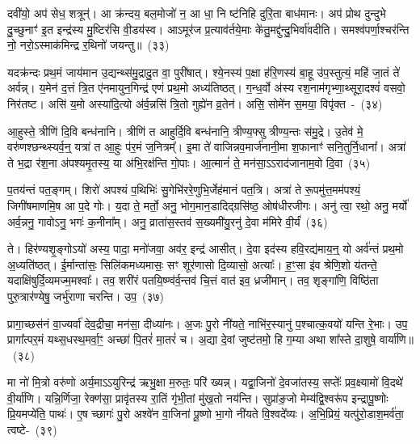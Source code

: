दवी॑यो॒ अप॑ सेध॒ शत्रून्॑। आ क्र॑न्दय॒ बल॒मोजो॑ न॒ आ धा॒ नि ष्ट॑निहि दुरि॒ता बाध॑मानः। अप॑ प्रोथ दुन्दुभे दु॒च्छुनाꣳ॑ इ॒त इन्द्र॑स्य मु॒ष्टिर॑सि वी॒डय॑स्व। आऽमूर॑ज प्र॒त्याव॑र्तये॒माः के॑तु॒मद्दु॑न्दु॒भिर्वा॑वदीति। समश्व॑पर्णा॒श्चर॑न्ति नो॒ नरो॒\-ऽस्माक॑मिन्द्र र॒थिनो॑ जयन्तु॥~(३३)\ip

{\anuvakamend[{धन्व॑न्महि॒मानं॒ ब्राह्म॑णा॒सो\-ऽदि॑तिः पृथि॒व्याः परि॑ दू॒रादेक॑चत्वारिꣳशच्च}]}

यदक्र॑न्दः प्रथ॒मं जाय॑मान उ॒द्यन्थ्स॑मु॒द्रादु॒त वा॒ पुरी॑षात्। श्ये॒नस्य॑ प॒क्षा ह॑रि॒णस्य॑ बा॒हू उ॑प॒स्तुत्यं॒ महि॑ जा॒तं ते॑ अर्वन्न्। य॒मेन॑ द॒त्तं त्रि॒त ए॑नमायुन॒गिन्द्र॑ एणं प्रथ॒मो अध्य॑तिष्ठत्। ग॒न्ध॒र्वो अ॑स्य रश॒नाम॑गृभ्णा॒थ्सूरा॒दश्वं॑ वसवो॒ निर॑तष्ट। असि॑ य॒मो अस्या॑दि॒त्यो अ॑र्व॒न्नसि॑ त्रि॒तो गुह्ये॑न व्र॒तेन॑। असि॒ सोमे॑न स॒मया॒ विपृ॑क्त~-~(३४)\ip

आ॒हुस्ते॒ त्रीणि॑ दि॒वि बन्ध॑नानि। त्रीणि॑ त आहुर्दि॒वि बन्ध॑नानि॒ त्रीण्य॒फ्सु त्रीण्य॒न्तः स॑मु॒द्रे। उ॒तेव॑ मे॒ वरु॑णश्छन्थ्स्यर्व॒न्॒ यत्रा॑ त आ॒हुः प॑र॒मं ज॒नित्रम्᳚। इ॒मा ते॑ वाजिन्नव॒मार्ज॑नानी॒मा श॒फानाꣳ॑ सनि॒तुर्नि॒धाना᳚। अत्रा॑ ते भ॒द्रा र॑श॒ना अ॑पश्यमृ॒तस्य॒ या अ॑भि॒रक्ष॑न्ति गो॒पाः। आ॒त्मानं॑ ते॒ मन॑सा॒\-ऽऽ\-राद॑जानाम॒वो दि॒वा~(३५)\ip

प॒तय॑न्तं पत॒ङ्गम्। शिरो॑ अपश्यं प॒थिभिः॑ सु॒गेभि॑ररे॒णुभि॒र्जेह॑मानं पत॒त्रि। अत्रा॑ ते रू॒पमु॑त्त॒मम॑पश्यं॒ जिगी॑षमाणमि॒ष आ प॒दे गोः। य॒दा ते॒ मर्तो॒ अनु॒ भोग॒मान॒डादिद्ग्रसि॑ष्ठ॒ ओष॑धीरजीगः। अनु॑ त्वा॒ रथो॒ अनु॒ मर्यो॑ अर्व॒न्ननु॒ गावो\-ऽनु॒ भगः॑ क॒नीना᳚म्। अनु॒ व्राता॑स॒स्तव॑ स॒ख्यमी॑यु॒रनु॑ दे॒वा म॑मिरे वी॒र्यं॑~(३६)\ip

ते। हिर॑ण्यशृ॒ङ्गो\-ऽयो॑ अस्य॒ पादा॒ मनो॑जवा॒ अव॑र॒ इन्द्र॑ आसीत्। दे॒वा इद॑स्य हवि॒रद्य॑माय॒न्॒ यो अर्व॑न्तं प्रथ॒मो अ॒ध्यति॑ष्ठत्। ई॒र्मान्ता॑सः॒ सिलि॑कमध्यमासः॒ सꣳ शूर॑णासो दि॒व्यासो॒ अत्याः᳚। ह॒ꣳ॒सा इ॑व श्रेणि॒शो य॑तन्ते॒ यदाक्षि॑षुर्दि॒व्यमज्म॒मश्वाः᳚। तव॒ शरी॑रं पतयि॒ष्ण्व॑र्व॒न्तव॑ चि॒त्तं वात॑ इव॒ ध्रजी॑मान्। तव॒ शृङ्गा॑णि॒ विष्ठि॑ता पुरु॒त्रार॑ण्येषु॒ जर्भु॑राणा चरन्ति। उप॒~(३७)\ip

प्रागा॒च्छस॑नं वा॒ज्यर्वा॑ देव॒द्रीचा॒ मन॑सा॒ दीध्या॑नः। अ॒जः पु॒रो नी॑यते॒ नाभि॑र॒स्यानु॑ प॒श्चात्क॒वयो॑ यन्ति रे॒भाः। उप॒ प्रागा᳚त्पर॒मं यथ्स॒धस्थ॒मर्वा॒ꣳ॒ अच्छा॑ पि॒तरं॑ मा॒तरं॑ च। अ॒द्या दे॒वां जुष्ट॑तमो॒ हि ग॒म्या अथा शा᳚स्ते दा॒शुषे॒ वार्या॑णि॥~(३८)\ip

{\anuvakamend[{विपृ॑क्तो दि॒वा वी॒र्य॑मुपैका॒न्नच॑त्वारि॒ꣳ॒शच्च॑}]}

मा नो॑ मि॒त्रो वरु॑णो अर्य॒मा\-ऽऽ\-युरिन्द्र॑ ऋभु॒क्षा म॒रुतः॒ परि॑ ख्यन्न्। यद्वा॒जिनो॑ दे॒वजा॑तस्य॒ सप्तेः᳚ प्रव॒क्ष्यामो॑ वि॒दथे॑ वी॒र्या॑णि। यन्नि॒र्णिजा॒ रेक्ण॑सा॒ प्रावृ॑तस्य रा॒तिं गृ॑भी॒तां मु॑ख॒तो नय॑न्ति। सुप्रा॑ङ॒जो मेम्य॑द्वि॒श्वरू॑प इन्द्रापू॒ष्णोः प्रि॒यमप्ये॑ति॒ पाथः॑। ए॒ष च्छागः॑ पु॒रो अश्वे॑न वा॒जिना॑ पू॒ष्णो भा॒गो नी॑यते वि॒श्वदे᳚व्यः। अ॒भि॒प्रियं॒ यत्पु॑रो॒डाश॒मर्व॑ता॒ त्वष्टे-~(३९)\ip

